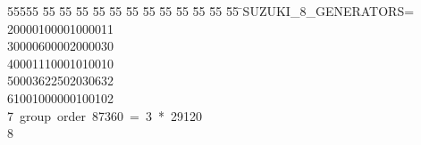 %
%
\begin{tabbing}
55555 \= 55 \= 55 \= 55 \= 55 \= 55 \= 55 \= 55 \= 55 \= 55 \= 55 \= 55 \= 55 \= \>SUZUKI\_8\_GENERATORS=\\[0pt]
20000100001000011\ \\[0pt]
30000600002000030\ \\[0pt]
40001110001010010\ \\[0pt]
50003622502030632\ \\[0pt]
61001000000100102\\[0pt]
7\>\ group\ order\ 87360\ =\ 3\ *\ 29120\\[0pt]
8\>\end{tabbing}
